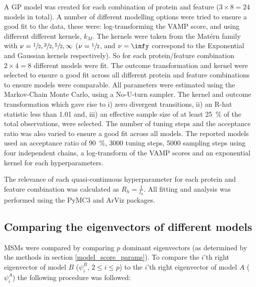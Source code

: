 \documentclass[journal=jacsat,manuscript=article]{achemso}
\begin{document}
 A GP model was created for each combination of protein and feature ($3\times 8=24$ models in total). A number of different modelling options were tried to ensure a good fit to the data, these were: log-transforming the VAMP score, and using different different kernels, $k_{M}$. The kernels were taken from the Mat\'ern family with $\nu=\sfrac{1}{2}, \sfrac{3}{2}, \sfrac{5}{2}, \infty$ ($\nu=\sfrac{1}{2}$, and $\nu=\infy$ correspond to the Exponential and Gaussian kernels respectively). So for each protein/feature combination $2\times 4 =8$ different models were fit. The outcome transformation and kernel were selected to ensure a good fit across all different protein and feature combinations to ensure models were comparable.  All parameters were estimated using the Markov-Chain Monte Carlo, using a No-U-turn sampler. The kernel and outcome transformation which gave rise to i) zero divergent transitions, ii) an R-hat statistic less than 1.01 and,  iii) an effective sample size of at least \SI{25}{\percent} of the total observations,  were selected.  The number of tuning steps and the acceptance ratio was also varied to ensure a good fit across all models. The reported models used an acceptance ratio of \SI{90}{\percent}, \num{3000} tuning steps, \num{5000} sampling steps using four independent chains, a log-transform of the VAMP scores and an exponential kernel for each hyperparameters.  
 
 The relevance of each quasi-continuous hyperparameter for each protein and feature combination was calculated as $R_{h} = \frac{1}{l_{h}}$.  
 All fitting and analysis was performed using the PyMC3 and ArViz packages. 
 
 \subsection{Comparing the eigenvectors of different models}
 
MSMs were compared by comparing $p$ dominant eigenvectors (as determined by the methods in section \ref{model_score_params}). To compare the $i$'th right eigenvector of model $B$ ($\psi^{B}_{i}$, $2 \le i \le p$) to the $i$'th right eigenvector of model $A$ ($\psi^{A}_{i}$) the following procedure was followed: 
\end{document}
